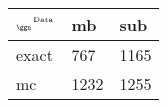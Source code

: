 \begin{tabular}{lll}
    \toprule
    $_{\text{\tiny{\ggn}}}$$^{\text{\tiny{Data}}}$ & mb & sub \\
    \midrule
    exact & 767
              & 1165 \\
    mc   & 1232
              & 1255 \\
    \bottomrule
\end{tabular}